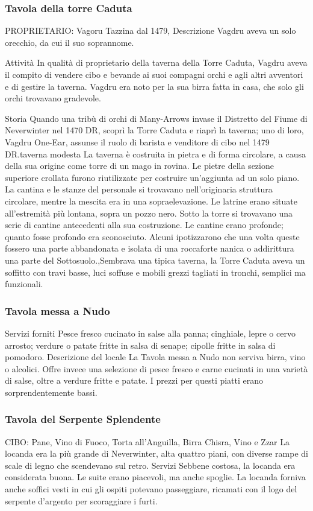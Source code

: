 \documentclass{article}
\begin{document}
\subsubsection{Tavola della torre Caduta}
PROPRIETARIO: Vagoru Tazzina dal 1479, Descrizione
Vagdru aveva un solo orecchio, da cui il suo soprannome.


Attività
In qualità di proprietario della taverna della Torre Caduta, Vagdru aveva il compito di vendere cibo e bevande ai suoi compagni orchi e agli altri avventori e di gestire la taverna. Vagdru era noto per la sua birra fatta in casa, che solo gli orchi trovavano gradevole.

Storia
Quando una tribù di orchi di Many-Arrows invase il Distretto del Fiume di Neverwinter nel 1470 DR, scoprì la Torre Caduta e riaprì la taverna; uno di loro, Vagdru One-Ear, assunse il ruolo di barista e venditore di cibo nel 1479 DR.taverna modesta
La taverna è costruita in pietra e di forma circolare, a causa della sua origine come torre di un mago in rovina. Le pietre della sezione superiore crollata furono riutilizzate per costruire un'aggiunta ad un solo piano. La cantina e le stanze del personale si trovavano nell'originaria struttura circolare, mentre la mescita era in una sopraelevazione. Le latrine erano situate all'estremità più lontana, sopra un pozzo nero. Sotto la torre si trovavano una serie di cantine antecedenti alla sua costruzione. Le cantine erano profonde; quanto fosse profondo era sconosciuto. Alcuni ipotizzarono che una volta queste fossero una parte abbandonata e isolata di una roccaforte nanica o addirittura una parte del Sottosuolo.,Sembrava una tipica taverna, la Torre Caduta aveva un soffitto con travi basse, luci soffuse e mobili grezzi tagliati in tronchi, semplici ma funzionali.
\subsubsection{Tavola messa a Nudo}
Servizi forniti\newline
Pesce fresco cucinato in salse alla panna; cinghiale, lepre o cervo arrosto; verdure o patate fritte in salsa di senape; cipolle fritte in salsa di pomodoro.\newline
Descrizione del locale\newline
La Tavola messa a Nudo non serviva birra, vino o alcolici. Offre invece una selezione di pesce fresco e carne cucinati in una varietà di salse, oltre a verdure fritte e patate. I prezzi per questi piatti erano sorprendentemente bassi.
\subsubsection{Tavola del Serpente Splendente}
CIBO: Pane, Vino di Fuoco, Torta all'Anguilla, Birra Chisra, Vino e Zzar\newline
La locanda era la più grande di Neverwinter, alta quattro piani, con diverse rampe di scale di legno che scendevano sul retro. Servizi Sebbene costosa, la locanda era considerata buona. Le suite erano piacevoli, ma anche spoglie. La locanda forniva anche soffici vesti in cui gli ospiti potevano passeggiare, ricamati con il logo del serpente d'argento per scoraggiare i furti.
\end{document}
